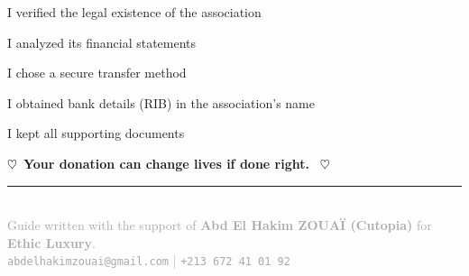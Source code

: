 \documentclass[12pt, a4paper]{article}
\newcommand{\heart}{\textcolor{cutopia}{\textbf{$\heartsuit$}}}
\begin{document}
\begin{tcolorbox}[colback=lightgray, colframe=darkgray]
    \begin{checklist}
        \item[$\square$] I verified the legal existence of the association
        \item[$\square$] I analyzed its financial statements
        \item[$\square$] I chose a secure transfer method
        \item[$\square$] I obtained bank details (RIB) in the association's name
        \item[$\square$] I kept all supporting documents
    \end{checklist}
\end{tcolorbox}

\vspace{1cm}
\begin{center}
    \heart\ \textcolor{cutopia}{\textbf{Your donation can change lives if done right.}} \ \heart
\end{center}

\vspace{0.5cm}
\begin{center}
    \rule{0.6\textwidth}{0.3pt} \\[0.3cm]
    {\small \textcolor{darkgray}{Guide written with the support of \textbf{Abd El Hakim ZOUAÏ (Cutopia)} for \textbf{Ethic Luxury}.}} \\
    \small{\textcolor{darkgray}{\texttt{abdelhakimzouai@gmail.com} \quad | \quad \texttt{+213 672 41 01 92}}}
\end{center}
\end{document}
